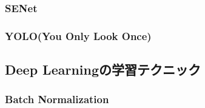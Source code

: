 \subsubsection{SENet}


\subsubsection{YOLO(You Only Look Once)}


\subsection{Deep Learningの学習テクニック}
\subsubsection{Batch Normalization}


